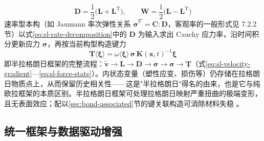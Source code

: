 \begin{equation}
  \mathbf{D}=\frac{1}{2}\bigl(\mathbf{L}+\mathbf{L}^{\mathrm{T}}\bigr),\qquad
  \mathbf{W}=\frac{1}{2}\bigl(\mathbf{L}-\mathbf{L}^{\mathrm{T}}\bigr)
  \label{eq:sl-rate-decomposition}
\end{equation}
速率型本构（如 Jaumann 率次弹性关系 $\dot{\boldsymbol{\sigma}}^{\nabla}=\mathbf{C}:\mathbf{D}$，客观率的一般形式见 7.2.2 节）以式\eqref{eq:sl-rate-decomposition}中的 $\mathbf{D}$ 为输入求出 Cauchy 应力率，沿时间积分更新应力 $\boldsymbol{\sigma}$，再按当前构型构造键力
\begin{equation}
  \underline{\mathbf{T}}\langle\boldsymbol{\xi}\rangle
  =\omega\langle\boldsymbol{\xi}\rangle\,\boldsymbol{\sigma}\,\mathbf{K}(\mathbf{x},t)^{-1}\boldsymbol{\xi}
  \label{eq:sl-force-state}
\end{equation}
即半拉格朗日框架的完整流程：$\tilde{\mathbf{v}}\to\mathbf{L}\to\mathbf{D}\to\dot{\boldsymbol{\sigma}}\to\boldsymbol{\sigma}\to\underline{\mathbf{T}}$（式\eqref{eq:sl-velocity-gradient}—\eqref{eq:sl-force-state}）。内状态变量（塑性应变、损伤等）仍存储在拉格朗日物质点上，从而保留历史相关性——这是"半拉格朗日"得名的由来，也是它与纯欧拉框架的本质区别。半拉格朗日框架可处理拉格朗日映射严重扭曲的极端变形，且无表面效应；配以\ref{sec:bond-associated}节的键关联构造可消除材料失稳 \cite{BehzadinasabFoster2020}。

\subsection{统一框架与数据驱动增强}\label{sec:data-driven}


